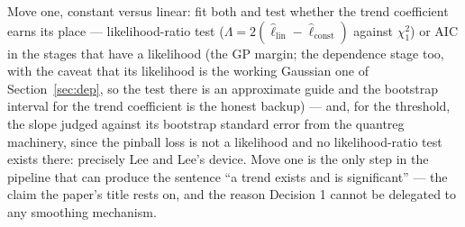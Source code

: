 \documentclass[11pt]{article}
\begin{document}
Move one, constant versus linear: fit both and test whether the trend coefficient earns its place --- likelihood-ratio test ($\Lambda = 2(\hat\ell_{\mathrm{lin}} - \hat\ell_{\mathrm{const}})$ against $\chi^2_1$) or AIC in the stages that have a likelihood (the GP margin; the dependence stage too, with the caveat that its likelihood is the working Gaussian one of Section~\ref{sec:dep}, so the test there is an approximate guide and the bootstrap interval for the trend coefficient is the honest backup) --- and, for the threshold, the slope judged against its bootstrap standard error from the quantreg machinery, since the pinball loss is not a likelihood and no likelihood-ratio test exists there: precisely Lee and Lee's device. Move one is the only step in the pipeline that can produce the sentence ``a trend exists and is significant'' --- the claim the paper's title rests on, and the reason Decision 1 cannot be delegated to any smoothing mechanism. 
\end{document}
